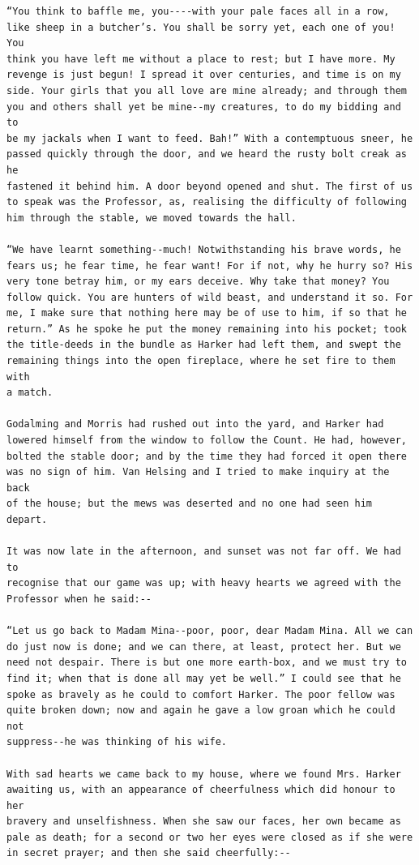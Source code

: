 \documentclass{article}
\begin{document}
\begin{verbatim}
“You think to baffle me, you----with your pale faces all in a row,
like sheep in a butcher’s. You shall be sorry yet, each one of you! You
think you have left me without a place to rest; but I have more. My
revenge is just begun! I spread it over centuries, and time is on my
side. Your girls that you all love are mine already; and through them
you and others shall yet be mine--my creatures, to do my bidding and to
be my jackals when I want to feed. Bah!” With a contemptuous sneer, he
passed quickly through the door, and we heard the rusty bolt creak as he
fastened it behind him. A door beyond opened and shut. The first of us
to speak was the Professor, as, realising the difficulty of following
him through the stable, we moved towards the hall.

“We have learnt something--much! Notwithstanding his brave words, he
fears us; he fear time, he fear want! For if not, why he hurry so? His
very tone betray him, or my ears deceive. Why take that money? You
follow quick. You are hunters of wild beast, and understand it so. For
me, I make sure that nothing here may be of use to him, if so that he
return.” As he spoke he put the money remaining into his pocket; took
the title-deeds in the bundle as Harker had left them, and swept the
remaining things into the open fireplace, where he set fire to them with
a match.

Godalming and Morris had rushed out into the yard, and Harker had
lowered himself from the window to follow the Count. He had, however,
bolted the stable door; and by the time they had forced it open there
was no sign of him. Van Helsing and I tried to make inquiry at the back
of the house; but the mews was deserted and no one had seen him depart.

It was now late in the afternoon, and sunset was not far off. We had to
recognise that our game was up; with heavy hearts we agreed with the
Professor when he said:--

“Let us go back to Madam Mina--poor, poor, dear Madam Mina. All we can
do just now is done; and we can there, at least, protect her. But we
need not despair. There is but one more earth-box, and we must try to
find it; when that is done all may yet be well.” I could see that he
spoke as bravely as he could to comfort Harker. The poor fellow was
quite broken down; now and again he gave a low groan which he could not
suppress--he was thinking of his wife.

With sad hearts we came back to my house, where we found Mrs. Harker
awaiting us, with an appearance of cheerfulness which did honour to her
bravery and unselfishness. When she saw our faces, her own became as
pale as death; for a second or two her eyes were closed as if she were
in secret prayer; and then she said cheerfully:--


\end{verbatim}
\end{document}
